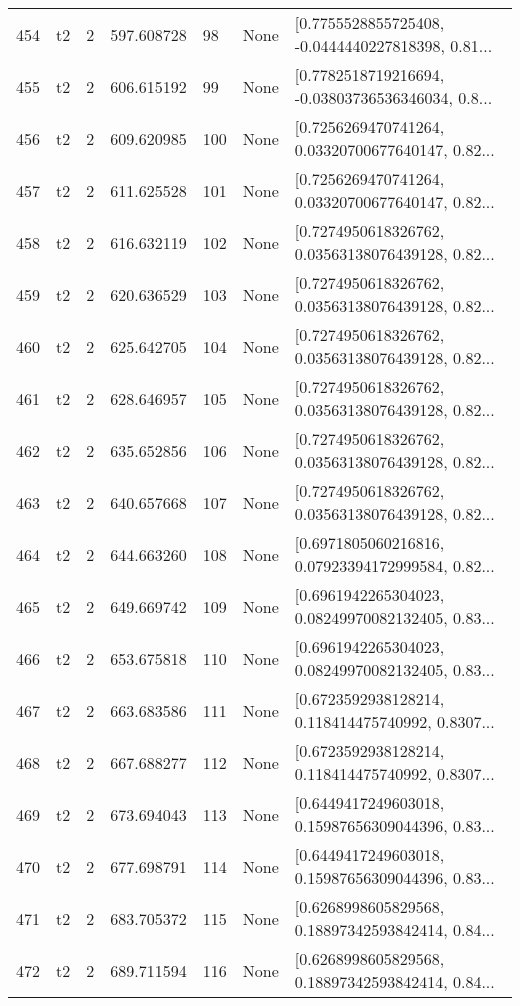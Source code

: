 \begin{tabular}{lllrlll}
454 &  t2 &   2 &   597.608728 &   98 &  None &  [0.7755528855725408, -0.0444440227818398, 0.81... \\
455 &  t2 &   2 &   606.615192 &   99 &  None &  [0.7782518719216694, -0.03803736536346034, 0.8... \\
456 &  t2 &   2 &   609.620985 &  100 &  None &  [0.7256269470741264, 0.03320700677640147, 0.82... \\
457 &  t2 &   2 &   611.625528 &  101 &  None &  [0.7256269470741264, 0.03320700677640147, 0.82... \\
458 &  t2 &   2 &   616.632119 &  102 &  None &  [0.7274950618326762, 0.03563138076439128, 0.82... \\
459 &  t2 &   2 &   620.636529 &  103 &  None &  [0.7274950618326762, 0.03563138076439128, 0.82... \\
460 &  t2 &   2 &   625.642705 &  104 &  None &  [0.7274950618326762, 0.03563138076439128, 0.82... \\
461 &  t2 &   2 &   628.646957 &  105 &  None &  [0.7274950618326762, 0.03563138076439128, 0.82... \\
462 &  t2 &   2 &   635.652856 &  106 &  None &  [0.7274950618326762, 0.03563138076439128, 0.82... \\
463 &  t2 &   2 &   640.657668 &  107 &  None &  [0.7274950618326762, 0.03563138076439128, 0.82... \\
464 &  t2 &   2 &   644.663260 &  108 &  None &  [0.6971805060216816, 0.07923394172999584, 0.82... \\
465 &  t2 &   2 &   649.669742 &  109 &  None &  [0.6961942265304023, 0.08249970082132405, 0.83... \\
466 &  t2 &   2 &   653.675818 &  110 &  None &  [0.6961942265304023, 0.08249970082132405, 0.83... \\
467 &  t2 &   2 &   663.683586 &  111 &  None &  [0.6723592938128214, 0.118414475740992, 0.8307... \\
468 &  t2 &   2 &   667.688277 &  112 &  None &  [0.6723592938128214, 0.118414475740992, 0.8307... \\
469 &  t2 &   2 &   673.694043 &  113 &  None &  [0.6449417249603018, 0.15987656309044396, 0.83... \\
470 &  t2 &   2 &   677.698791 &  114 &  None &  [0.6449417249603018, 0.15987656309044396, 0.83... \\
471 &  t2 &   2 &   683.705372 &  115 &  None &  [0.6268998605829568, 0.18897342593842414, 0.84... \\
472 &  t2 &   2 &   689.711594 &  116 &  None &  [0.6268998605829568, 0.18897342593842414, 0.84... \\

\end{tabular}
